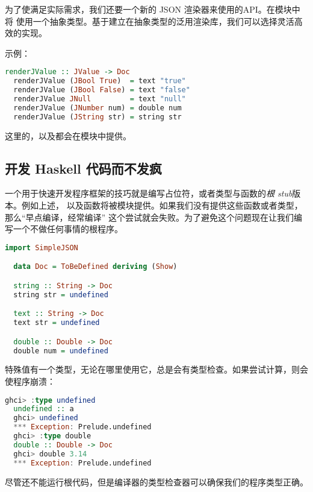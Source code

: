 \documentclass[./main.tex]{subfiles}
\begin{document}
为了使满足实际需求，我们还要一个新的 JSON 渲染器来使用的API。在模块中将
使用一个抽象类型。基于建立在抽象类型的泛用渲染库，我们可以选择灵活高效的实现。

示例：

\begin{lstlisting}[language=Haskell]
  renderJValue :: JValue -> Doc
  renderJValue (JBool True)  = text "true"
  renderJValue (JBool False) = text "false"
  renderJValue JNull         = text "null"
  renderJValue (JNumber num) = double num
  renderJValue (JString str) = string str
\end{lstlisting}

这里的，以及都会在模块中提供。

\subsection*{开发 Haskell 代码而不发疯}

一个用于快速开发程序框架的技巧就是编写占位符，或者类型与函数的\textit{根 stub}版本。例如上述，
以及函数将被模块提供。如果我们没有提供这些函数或者类型，那么“早点编译，经常编译”
这个尝试就会失败。为了避免这个问题现在让我们编写一个不做任何事情的根程序。

\begin{lstlisting}[language=Haskell]
  import SimpleJSON

  data Doc = ToBeDefined deriving (Show)

  string :: String -> Doc
  string str = undefined

  text :: String -> Doc
  text str = undefined

  double :: Double -> Doc
  double num = undefined
\end{lstlisting}

特殊值有一个类型，无论在哪里使用它，总是会有类型检查。如果尝试计算，则会使程序崩溃：

\begin{lstlisting}[language=Haskell]
  ghci> :type undefined
  undefined :: a
  ghci> undefined
  *** Exception: Prelude.undefined
  ghci> :type double
  double :: Double -> Doc
  ghci> double 3.14
  *** Exception: Prelude.undefined
\end{lstlisting}

尽管还不能运行根代码，但是编译器的类型检查器可以确保我们的程序类型正确。
\end{document}
